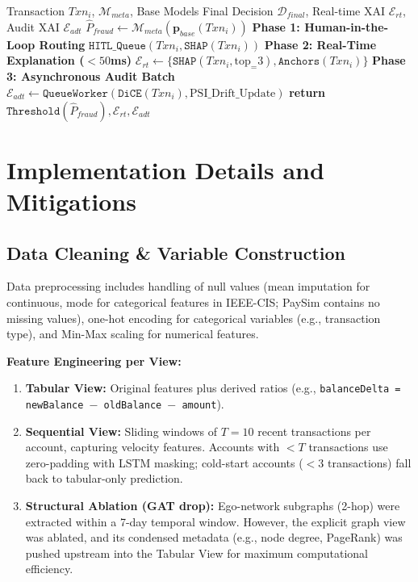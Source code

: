 \documentclass[10pt,a4paper,twocolumn]{article}
\begin{document}
\begin{algorithm}[H]
\caption{Dual-Stream XAI Inference and HITL Escalation}
\label{alg:infer}
\algrenewcommand{}
\algrenewcommand{}
\footnotesize
\begin{algorithmic}[1]
\Require Transaction $Txn_i$, $\mathcal{M}_{meta}$, Base Models
\Ensure Final Decision $\mathcal{D}_{final}$, Real-time XAI $\mathcal{E}_{rt}$, Audit XAI $\mathcal{E}_{adt}$
\State $\hat{P}_{fraud} \gets \mathcal{M}_{meta}(\mathbf{p}_{base}(Txn_i))$
\State \textbf{Phase 1: Human-in-the-Loop Routing}
    \State \Return $\mathtt{HITL\_Queue}(Txn_i, \mathtt{SHAP}(Txn_i))$ 
\EndIf
\State \textbf{Phase 2: Real-Time Explanation ($<50$ms)}
\State $\mathcal{E}_{rt} \gets \{ \mathtt{SHAP}(Txn_i, \text{top}_{=}3), \mathtt{Anchors}(Txn_i) \}$
\State \textbf{Phase 3: Asynchronous Audit Batch}
\State $\mathcal{E}_{adt} \gets \mathtt{QueueWorker}(\mathtt{DiCE}(Txn_i), \text{PSI\_Drift\_Update})$
\State \textbf{return} $\mathtt{Threshold}(\hat{P}_{fraud}), \mathcal{E}_{rt}, \mathcal{E}_{adt}$
\end{algorithmic}
\end{algorithm}




\section{Implementation Details and Mitigations}
\subsection{Data Cleaning \& Variable Construction}
Data preprocessing includes handling of null values (mean imputation for continuous, mode for categorical features in IEEE-CIS; PaySim contains no missing values), one-hot encoding for categorical variables (e.g., transaction type), and Min-Max scaling for numerical features.

\textbf{Feature Engineering per View:}
\begin{enumerate}
    \item \textbf{Tabular View:} Original features plus derived ratios (e.g., \texttt{balanceDelta = newBalance $-$ oldBalance $-$ amount}).
    \item \textbf{Sequential View:} Sliding windows of $T{=}10$ recent transactions per account, capturing velocity features. Accounts with $<T$ transactions use zero-padding with LSTM masking; cold-start accounts ($<3$ transactions) fall back to tabular-only prediction.
    \item \textbf{Structural Ablation (GAT drop):} Ego-network subgraphs (2-hop) were extracted within a 7-day temporal window. However, the explicit graph view was ablated, and its condensed metadata (e.g., node degree, PageRank) was pushed upstream into the Tabular View for maximum computational efficiency.
\end{enumerate}
\end{document}
